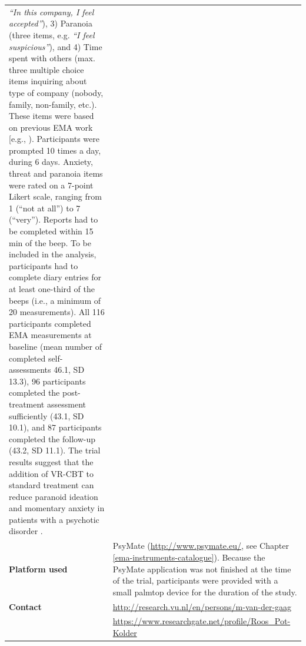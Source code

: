 \documentclass[]{book}
\begin{document}
\begin{longtable}[]{@{}ll@{}}
\begin{minipage}[t]{0.69\columnwidth}
\emph{``In this company, I feel accepted''}), 3) Paranoia (three items,
e.g. \emph{``I feel suspicious''}), and 4) Time spent with others (max.
three multiple choice items inquiring about type of company (nobody,
family, non-family, etc.). These items were based on previous EMA work
{[}e.g., \citet{collip2011social}). Participants were prompted 10 times
a day, during 6 days. Anxiety, threat and paranoia items were rated on a
7-point Likert scale, ranging from 1 (``not at all'') to 7 (``very'').
Reports had to be completed within 15 min of the beep. To be included in
the analysis, participants had to complete diary entries for at least
one-third of the beeps (i.e., a minimum of 20 measurements). All 116
participants completed EMA measurements at baseline (mean number of
completed self-assessments 46.1, SD 13.3), 96 participants completed the
post-treatment assessment sufficiently (43.1, SD 10.1), and 87
participants completed the follow-up (43.2, SD 11.1). The trial results
suggest that the addition of VR-CBT to standard treatment can reduce
paranoid ideation and momentary anxiety in patients with a psychotic
disorder \citep{pot2018}.\strut
\end{minipage}\tabularnewline
\begin{minipage}[t]{0.25\columnwidth}\raggedright\strut
\textbf{Platform used}\strut
\end{minipage} & \begin{minipage}[t]{0.69\columnwidth}\raggedright\strut
PsyMate (\url{http://www.psymate.eu/}, see Chapter
\ref{ema-instruments-catalogue}). Because the PsyMate application was
not finished at the time of the trial, participants were provided with a
small palmtop device for the duration of the study.\strut
\end{minipage}\tabularnewline
\begin{minipage}[t]{0.25\columnwidth}\raggedright\strut
\textbf{Contact}\strut
\end{minipage} & \begin{minipage}[t]{0.69\columnwidth}\raggedright\strut
\url{http://research.vu.nl/en/persons/m-van-der-gaag}\strut
\end{minipage}\tabularnewline
\begin{minipage}[t]{0.25\columnwidth}\raggedright\strut
\strut
\end{minipage} & \begin{minipage}[t]{0.69\columnwidth}\raggedright\strut
\url{https://www.researchgate.net/profile/Roos_Pot-Kolder}\strut
\end{minipage}\tabularnewline
\bottomrule
\end{longtable}
\end{document}
